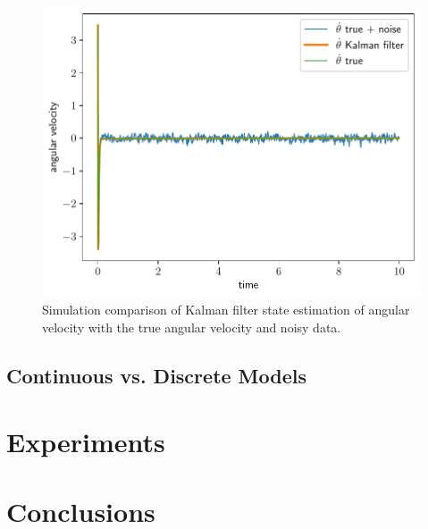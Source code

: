 \documentclass[]{article}
\begin{document}
\begin{figure}
	\centering
	\includegraphics[width=0.8\linewidth]{KFangular_velocity.pdf}
	\caption{Simulation comparison of Kalman filter state estimation of angular velocity with the true angular velocity and noisy data.}
	\label{fig:boat1}
\end{figure}

\subsection*{Continuous vs. Discrete Models}



\section*{Experiments}

\section*{Conclusions}

\end{document}
